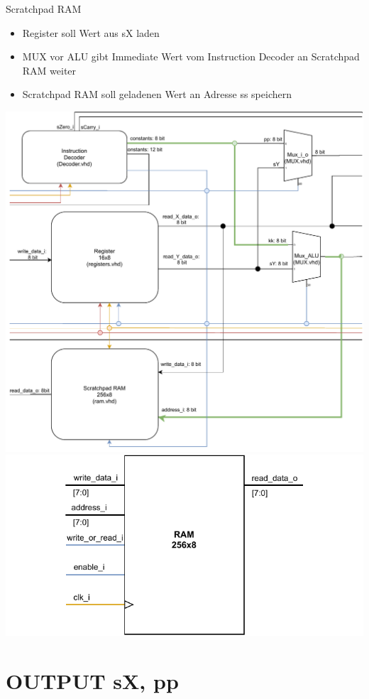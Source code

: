\documentclass[10pt, t,
aspectratio=169,%
usenames,
dvipsnames,
]{beamer}
\begin{document}
	\begin{frame}{Scratchpad RAM}	
		\begin{itemize}
			\item Register soll Wert aus sX laden
			\item MUX vor ALU gibt Immediate Wert vom Instruction Decoder an Scratchpad RAM weiter
			\item Scratchpad RAM soll geladenen Wert an Adresse ss speichern
		\end{itemize}
		\begin{multicols}{2}	
		\includegraphics[width=.7\linewidth]{../Blockbeschreibungen/RAM-BlockdiagramSnipits2.pdf}
		\includegraphics[width=\linewidth]{../Blockbeschreibungen/RAM_beschreibung.pdf}
		\end{multicols}
	\end{frame}

	\section{OUTPUT sX, pp}
	
\end{document}
